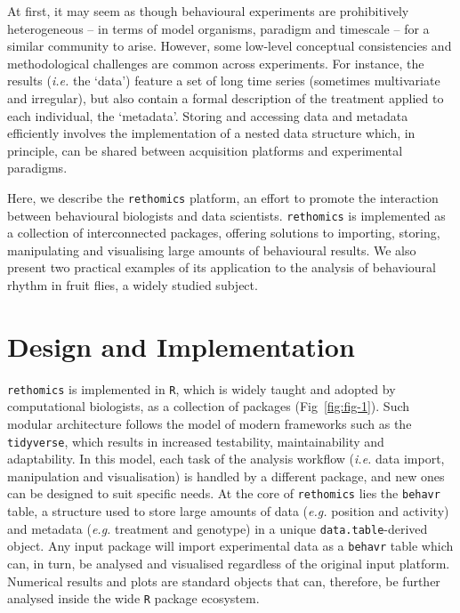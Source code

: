 \documentclass[10pt,letterpaper]{article}\usepackage[]{graphicx}\usepackage[]{color}
\begin{document}
At first, it may seem as though behavioural experiments are prohibitively heterogeneous -- in terms of model organisms, paradigm and timescale -- for a similar community to arise.
However, some low-level conceptual consistencies and methodological challenges are common across experiments.
For instance, the results (\emph{i.e.} the `data')  feature a set of long time series (sometimes multivariate and irregular), but also contain a formal description of the treatment applied to each individual, the `metadata'.
Storing and accessing data and metadata efficiently involves the implementation of a nested data structure which, in principle,
can be shared between acquisition platforms and experimental paradigms.

Here, we describe the \texttt{rethomics} platform, an effort to promote the interaction between behavioural biologists and data scientists.
\texttt{rethomics} is implemented as a collection of interconnected packages, offering solutions to importing, storing, manipulating and visualising large amounts of behavioural results.
We also present two practical examples of its application to the analysis of behavioural rhythm in fruit flies, a widely studied subject.


\section*{Design and Implementation}
\texttt{rethomics} is implemented in \texttt{R}\cite{r_core_team_r_2017}, which is widely taught and adopted by computational biologists,
as a collection of packages (Fig~\ref{fig:fig-1}).
Such modular architecture follows the model of modern frameworks such as the \texttt{tidyverse}\cite{wickham_tidyverse_2017}, which results in increased testability, maintainability and adaptability.
In this model, each task of the analysis workflow (\emph{i.e.} data import, manipulation and visualisation) is handled by a different package, and new ones can be designed to suit specific needs.
At the core of \texttt{rethomics} lies the \texttt{behavr} table, a structure used to store large amounts of data (\emph{e.g.} position and activity) and metadata (\emph{e.g.} treatment and genotype) in a unique \texttt{data.table}-derived object\cite{dowle_data.table_2017}.
Any input package will import experimental data as a \texttt{behavr} table which can, in turn, be analysed and visualised regardless of the original input platform.
Numerical results and plots are standard objects that can, therefore, be further analysed inside the wide \texttt{R} package ecosystem.
\end{document}
